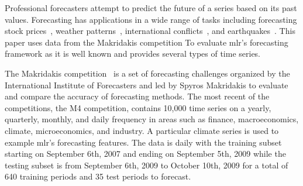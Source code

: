\documentclass[12pt]{article}\usepackage[]{graphicx}\usepackage[]{color}
\theoremstyle{definition}
\newcommand{\pkg}[1]{{\fontseries{b}\selectfont #1}}
\begin{document}
Professional forecasters attempt to predict the future of a series based on its past values. Forecasting has applications in a wide range of tasks including forecasting stock prices~\cite{GRANGER19923}, weather patterns~\cite{MurphymeteoForecast}, international conflicts~\cite{Chadefaux01012014}, and earthquakes~\cite{earthquakeYegu}. This paper uses data from the Makridakis competition To evaluate \pkg{mlr}'s forecasting framework as it is well known and provides several types of time series.

The Makridakis competition~\cite{Makridakis2000451} is a set of forecasting challenges organized by the International Institute of Forecasters and led by Spyros Makridakis to evaluate and compare the accuracy of forecasting methods. The most recent of the competitions, the M4 competition, contains 10,000 time series on a yearly, quarterly, monthly, and daily frequency in areas such as finance, macroeconomics, climate, microeconomics, and industry. A particular climate series is used to example \pkg{mlr}'s forecasting features. The data is daily with the training subset starting on September 6th, 2007 and ending on September 5th, 2009 while the testing subset is from September 6th, 2009 to October 10th, 2009 for a total of 640 training periods and 35 test periods to forecast.
\end{document}
